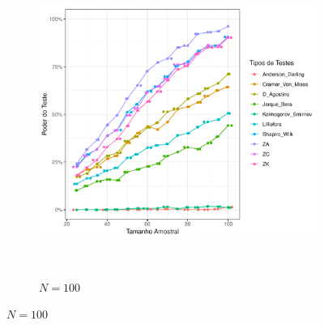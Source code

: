 \documentclass[final]{beamer}
\begin{document}
\begin{frame}[t]
\begin{columns}[t,totalwidth=0.6\paperwidth]
\begin{column}{0.45\textwidth}
\begin{figure}[H]
\begin{subfigure}[b]{0.32\textwidth}
        \includegraphics[height=10cm,keepaspectratio]{Distribuição_Beta/Poder_Teste/poder_teste_beta_100.pdf}
        \caption{\(N = 100\)}
    \end{subfigure}

    \vspace{1em}


\end{figure}
\end{column}
\end{columns}
\end{frame}
\end{document}
